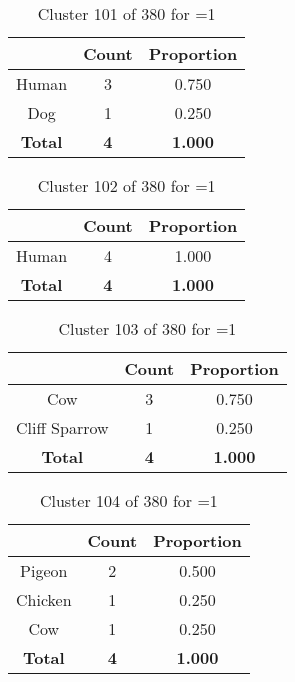 \begin{table}[ht!]
\centering
\begin{tabular}{|c|c|c|}
\hline
\bf \Spec{} &\bf Count &\bf Proportion\\ \hline \hline
Human & 3 & 0.750\\ \hline
Dog & 1 & 0.250\\ \hline
\hline
\bf Total & \bf 4 & \bf 1.000\\ \hline
\end{tabular}
\label{tab:cluster:101:1}
\caption{Cluster 101 of 380 for \minneigh{}=1}
\end{table}

\begin{table}[ht!]
\centering
\begin{tabular}{|c|c|c|}
\hline
\bf \Spec{} &\bf Count &\bf Proportion\\ \hline \hline
Human & 4 & 1.000\\ \hline
\hline
\bf Total & \bf 4 & \bf 1.000\\ \hline
\end{tabular}
\label{tab:cluster:102:1}
\caption{Cluster 102 of 380 for \minneigh{}=1}
\end{table}

\begin{table}[ht!]
\centering
\begin{tabular}{|c|c|c|}
\hline
\bf \Spec{} &\bf Count &\bf Proportion\\ \hline \hline
Cow & 3 & 0.750\\ \hline
Cliff Sparrow & 1 & 0.250\\ \hline
\hline
\bf Total & \bf 4 & \bf 1.000\\ \hline
\end{tabular}
\label{tab:cluster:103:1}
\caption{Cluster 103 of 380 for \minneigh{}=1}
\end{table}

\begin{table}[ht!]
\centering
\begin{tabular}{|c|c|c|}
\hline
\bf \Spec{} &\bf Count &\bf Proportion\\ \hline \hline
Pigeon & 2 & 0.500\\ \hline
Chicken & 1 & 0.250\\ \hline
Cow & 1 & 0.250\\ \hline
\hline
\bf Total & \bf 4 & \bf 1.000\\ \hline
\end{tabular}
\label{tab:cluster:104:1}
\caption{Cluster 104 of 380 for \minneigh{}=1}
\end{table}

